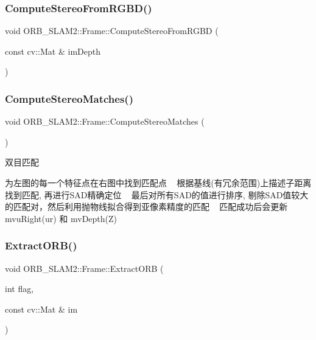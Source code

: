 \subsubsection{\texorpdfstring{Compute\+Stereo\+From\+R\+G\+B\+D()}{ComputeStereoFromRGBD()}}
{\footnotesize\ttfamily void O\+R\+B\+\_\+\+S\+L\+A\+M2\+::\+Frame\+::\+Compute\+Stereo\+From\+R\+G\+BD (\begin{DoxyParamCaption}\item[{const cv\+::\+Mat \&}]{im\+Depth }\end{DoxyParamCaption})}

\mbox{\label{class_o_r_b___s_l_a_m2_1_1_frame_a77a570d7851bad90ca31c4d55a5105e7}} 
\subsubsection{\texorpdfstring{Compute\+Stereo\+Matches()}{ComputeStereoMatches()}}
{\footnotesize\ttfamily void O\+R\+B\+\_\+\+S\+L\+A\+M2\+::\+Frame\+::\+Compute\+Stereo\+Matches (\begin{DoxyParamCaption}{ }\end{DoxyParamCaption})}



双目匹配 

为左图的每一个特征点在右图中找到匹配点 ~\newline
根据基线(有冗余范围)上描述子距离找到匹配, 再进行\+S\+A\+D精确定位 ~\newline
最后对所有\+S\+A\+D的值进行排序, 剔除\+S\+A\+D值较大的匹配对，然后利用抛物线拟合得到亚像素精度的匹配 ~\newline
匹配成功后会更新 mvu\+Right(ur) 和 mv\+Depth(\+Z) \mbox{\label{class_o_r_b___s_l_a_m2_1_1_frame_a626aef981e9fd9caff63bf93f1abf47f}} 
\subsubsection{\texorpdfstring{Extract\+O\+R\+B()}{ExtractORB()}}
{\footnotesize\ttfamily void O\+R\+B\+\_\+\+S\+L\+A\+M2\+::\+Frame\+::\+Extract\+O\+RB (\begin{DoxyParamCaption}\item[{int}]{flag,  }\item[{const cv\+::\+Mat \&}]{im }\end{DoxyParamCaption})}


